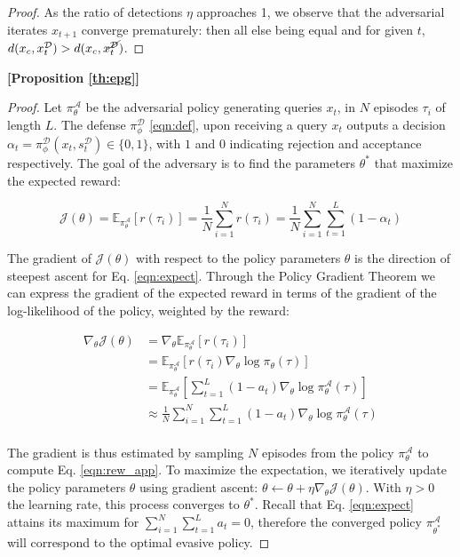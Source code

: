 \begin{proof}
As the ratio of detections $\eta$ approaches 1, we observe that the adversarial iterates $x_{t+1}$ converge prematurely: then all else being equal and for given $t$, $d(x_c,x^\mathcal{D}_t) > d(x_c, x^{\cancel{\mathcal{D}}}_t)$.

\end{proof}

\textbf{[Proposition \ref{th:epg}]}

\begin{proof}
Let $\pi_\theta^\mathcal{A}$ be the adversarial policy generating queries $x_t$, in $N$ episodes $\tau_i$ of length $L$.
The defense $\pi_\phi^{\mathcal{D}}$ \eqref{eqn:def}, upon receiving a query $x_t$ outputs a decision $\alpha_t = \pi_\phi^{\mathcal{D}}(x_t, s_t^\mathcal{D}) \in \{0,1\}$, with $1$ and $0$ indicating rejection and acceptance respectively.
The goal of the adversary is to find the parameters $\theta^*$ that maximize the expected reward:

\begin{equation}
\mathcal{J}(\theta) = \mathbb{E}_{\pi_\theta^\mathcal{A}} [r(\tau_i)] = \frac{1}{N}\sum_{i=1}^{N}r(\tau_i) = \frac{1}{N} \sum_{i=1}^{N} \sum_{t=1}^{L} (1 - \alpha_t)
\label{eqn:expect}
\end{equation}

The gradient of $\mathcal{J}(\theta)$ with respect to the policy parameters $\theta$ is the direction of steepest ascent for Eq. \eqref{eqn:expect}.
Through the Policy Gradient Theorem \cite{sutton1999policy} we can express the gradient of the expected reward in terms of the gradient of the log-likelihood of the policy, weighted by the reward:

\begin{equation}
\begin{aligned}
    \nabla_\theta \mathcal{J}(\theta) &= \nabla_\theta \mathbb{E}_{\pi_\theta^\mathcal{A}} [r(\tau_i)]\\
    &= \mathbb{E}_{\pi_\theta^{\mathcal{A}}}\left [r(\tau_i)\nabla_\theta \log \pi_\theta(\tau)\right]\\
    &= \mathbb{E}_{\pi_\theta^{\mathcal{A}}}\left[\sum_{t=1}^{L}(1 - a_t) \nabla_\theta \log \pi_\theta^{\mathcal{A}}(\tau)\right]\\
    &\approx \frac{1}{N}\sum_{i=1}^{N}\sum_{t=1}^{L}(1 - a_t) \nabla_\theta \log \pi_\theta^{\mathcal{A}}(\tau)\\
\label{eqn:rew_app}
\end{aligned}
\end{equation}

The gradient is thus estimated by sampling $N$ episodes from the policy $\pi_\theta^\mathcal{A}$ to compute Eq. \eqref{eqn:rew_app}.
To maximize the expectation, we iteratively update the policy parameters $\theta$ using gradient ascent: $\theta \leftarrow \theta + \eta \nabla_\theta \mathcal{J}(\theta)$.
With $\eta > 0$ the learning rate, this process converges to $\theta^*$.
Recall that Eq. \eqref{eqn:expect} attains its maximum for $\sum_{i=1}^{N}\sum_{t=1}^{L}a_t = 0$, therefore the converged policy $\pi^\mathcal{A}_{\theta^*}$ will correspond to the optimal evasive policy.

\end{proof}

